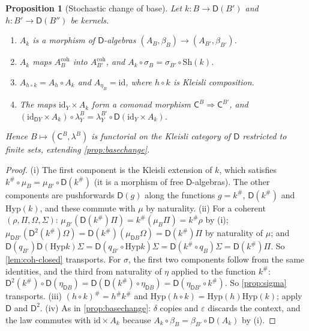 \documentclass[11pt]{article}
\newtheorem{proposition}[theorem]{Proposition}
\theoremstyle{definition}
\theoremstyle{remark}
\newcommand{\D}{\mathsf{D}}
\newcommand{\Hyp}{\mathrm{Hyp}}
\newcommand{\Sh}{\mathrm{Sh}}
\newcommand{\C}{\mathsf{C}}
\newcommand{\id}{\mathrm{id}}
\begin{document}
\begin{proposition}[Stochastic change of base]\label{prop:stoch-base}
Let $k\colon B\to\D(B')$ and $h\colon B'\to\D(B'')$ be kernels.
\begin{enumerate}[label=(\roman*)]
\item $A_k$ is a morphism of $\D$-algebras $(A_B,\beta_B)\to(A_{B'},\beta_{B'})$.
\item $A_k$ maps $A_B^{\mathrm{coh}}$ into $A_{B'}^{\mathrm{coh}}$, and $A_k\circ\sigma_B=\sigma_{B'}\circ\Sh(k)$.
\item $A_{h\circ k}=A_h\circ A_k$ and $A_{\eta_B}=\id$, where $h\circ k$ is Kleisli composition.
\item The maps $\id_Y\times A_k$ form a comonad morphism $\C^B\Rightarrow\C^{B'}$, and
  $(\id_{\D Y}\times A_k)\circ\lambda^B_Y=\lambda^{B'}_Y\circ\D(\id_Y\times A_k)$.
\end{enumerate}
Hence $B\mapsto(\C^B,\lambda^B)$ is functorial on the Kleisli category of $\D$ restricted to finite sets,
extending \cref{prop:basechange}.
\end{proposition}
\begin{proof}
(i) The first component is the Kleisli extension of $k$, which satisfies
$k^\#\circ\mu_B=\mu_{B'}\circ\D(k^\#)$ (it is a morphism of free $\D$-algebras). The other components are
pushforwards $\D(g)$ along the functions $g=k^\#$, $\D(k^\#)$ and $\Hyp(k)$, and these commute with $\mu$ by
naturality.
(ii) For a coherent $(\rho,\Pi,\Omega,\Sigma)$:
$\mu_{B'}(\D(k^\#)\Pi)=k^\#(\mu_B\Pi)=k^\#\rho$ by (i);
$\mu_{\D B'}(\D^2(k^\#)\Omega)=\D(k^\#)(\mu_{\D B}\Omega)=\D(k^\#)\Pi$ by naturality of $\mu$; and
$\D(q_{B'})\D(\Hyp k)\Sigma=\D(q_{B'}\circ\Hyp k)\Sigma=\D(k^\#\circ q_B)\Sigma=\D(k^\#)\Pi$. So
\cref{lem:coh-closed} transports. For $\sigma$, the first two components follow from the same identities,
and the third from naturality of $\eta$ applied to the function $k^\#$:
$\D^2(k^\#)\circ\D(\eta_{\D B})=\D(\D(k^\#)\circ\eta_{\D B})=\D(\eta_{\D B'}\circ k^\#)$.
So \cref{prop:sigma} transports.
(iii) $(h\circ k)^\#=h^\#k^\#$ and $\Hyp(h\circ k)=\Hyp(h)\Hyp(k)$; apply $\D$ and $\D^2$.
(iv) As in \cref{prop:basechange}: $\delta$ copies and $\varepsilon$ discards the context, and the law
commutes with $\id\times A_k$ because $A_k\circ\beta_B=\beta_{B'}\circ\D(A_k)$ by (i).
\end{proof}
\end{document}
